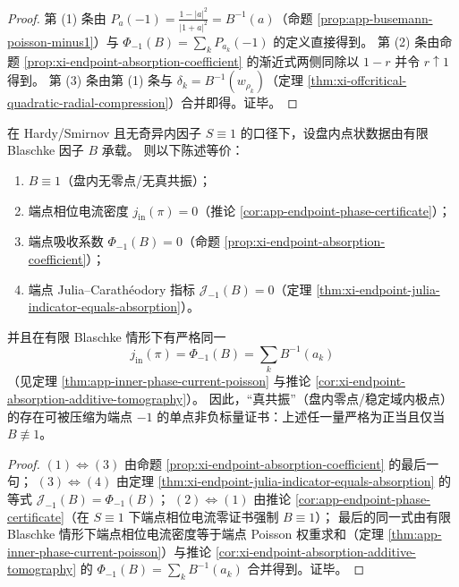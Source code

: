 \begin{proof}
第 (1) 条由 \(P_{a}(-1)=\frac{1-|a|^2}{|1+a|^2}=B^{-1}(a)\)（命题 \ref{prop:app-busemann-poisson-minus1}）与 \(\Phi_{-1}(B)=\sum_k P_{a_k}(-1)\) 的定义直接得到。
第 (2) 条由命题 \ref{prop:xi-endpoint-absorption-coefficient} 的渐近式两侧同除以 \(1-r\) 并令 \(r\uparrow 1\) 得到。
第 (3) 条由第 (1) 条与 \(\delta_k=B^{-1}(w_{\rho_k})\)（定理 \ref{thm:xi-offcritical-quadratic-radial-compression}）合并即得。证毕。
\end{proof}

\begin{theorem}\label{thm:xi-endpoint-single-point-certificate-complete}
在 Hardy/Smirnov 且无奇异内因子 \(S\equiv 1\) 的口径下，设盘内点状数据由有限 Blaschke 因子 \(B\) 承载。
则以下陈述等价：
\begin{enumerate}
  \item \(B\equiv 1\)（盘内无零点/无真共振）；
  \item 端点相位电流密度 \(j_{\mathrm{in}}(\pi)=0\)（推论 \ref{cor:app-endpoint-phase-certificate}）；
  \item 端点吸收系数 \(\Phi_{-1}(B)=0\)（命题 \ref{prop:xi-endpoint-absorption-coefficient}）；
  \item 端点 Julia--Carath\'eodory 指标 \(\mathcal{J}_{-1}(B)=0\)（定理 \ref{thm:xi-endpoint-julia-indicator-equals-absorption}）。
\end{enumerate}
并且在有限 Blaschke 情形下有严格同一
\[
\boxed{\;
j_{\mathrm{in}}(\pi)=\Phi_{-1}(B)=\sum_k B^{-1}(a_k)\; }
\]
（见定理 \ref{thm:app-inner-phase-current-poisson} 与推论 \ref{cor:xi-endpoint-absorption-additive-tomography}）。
因此，“真共振”（盘内零点/稳定域内极点）的存在可被压缩为端点 \(-1\) 的单点非负标量证书：上述任一量严格为正当且仅当 \(B\not\equiv 1\)。
\end{theorem}

\begin{proof}
\((1)\Leftrightarrow(3)\) 由命题 \ref{prop:xi-endpoint-absorption-coefficient} 的最后一句；
\((3)\Leftrightarrow(4)\) 由定理 \ref{thm:xi-endpoint-julia-indicator-equals-absorption} 的等式 \(\mathcal{J}_{-1}(B)=\Phi_{-1}(B)\)；
\((2)\Leftrightarrow(1)\) 由推论 \ref{cor:app-endpoint-phase-certificate}（在 \(S\equiv 1\) 下端点相位电流零证书强制 \(B\equiv 1\)）；
最后的同一式由有限 Blaschke 情形下端点相位电流密度等于端点 Poisson 权重求和（定理 \ref{thm:app-inner-phase-current-poisson}）与推论 \ref{cor:xi-endpoint-absorption-additive-tomography} 的 \(\Phi_{-1}(B)=\sum_k B^{-1}(a_k)\) 合并得到。证毕。
\end{proof}

